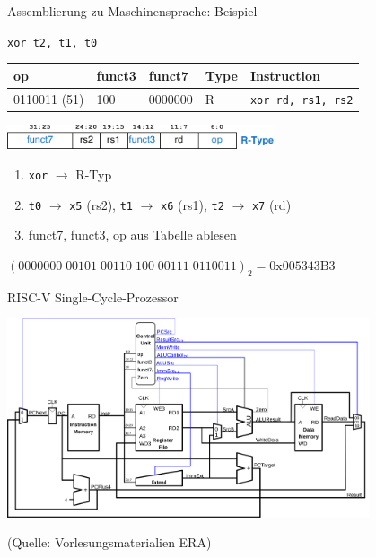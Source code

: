 \documentclass[
  german,            %
  aspectratio=169,    %
]{tumbeamer}
\begin{document}
\begin{frame}[c, fragile]{Assemblierung zu Maschinensprache: Beispiel}{}
	\begin{center}
		\large\texttt{xor t2, t1, t0}\\
		\scriptsize
		\begin{table}[]
			\begin{tabular}{|l|l|l|l|l|}
				\hline
				\rowcolor[HTML]{0078C3}
				{\color{white}\textbf{op}} & {\color{white}\textbf{funct3}} & {\color{white}\textbf{funct7}} & {\color{white}\textbf{Type}} & {\color{white}\textbf{Instruction}} \\ \hline
				0110011 (51)               & 100                            & 0000000                        & R                            & \texttt{xor rd, rs1, rs2}           \\ \hline
			\end{tabular}
		\end{table}

		\includegraphics[width=0.59\textwidth]{w08_r_type.pdf}
	\end{center}

	\begin{enumerate}
		\item \texttt{xor} $\rightarrow$ R-Typ
		\item \texttt{t0} $\rightarrow$ \texttt{x5} (rs2), \texttt{t1} $\rightarrow$ \texttt{x6} (rs1), \texttt{t2} $\rightarrow$ \texttt{x7} (rd)
		\item funct7, funct3, op aus Tabelle ablesen
	\end{enumerate}
	\begin{center}
		\Large
		$(0000000\;00101\;00110\;100\;00111\;0110011)_2 = \textrm{0x005343B3}$
	\end{center}

\end{frame}



\begin{frame}[c]{RISC-V Single-Cycle-Prozessor}{}
	\begin{center}
		\includegraphics[width=0.8\textwidth]{w08_single_cycle.png}
	\end{center}
	\centering
	\tiny (Quelle: Vorlesungsmaterialien ERA)
\end{frame}
\end{document}
